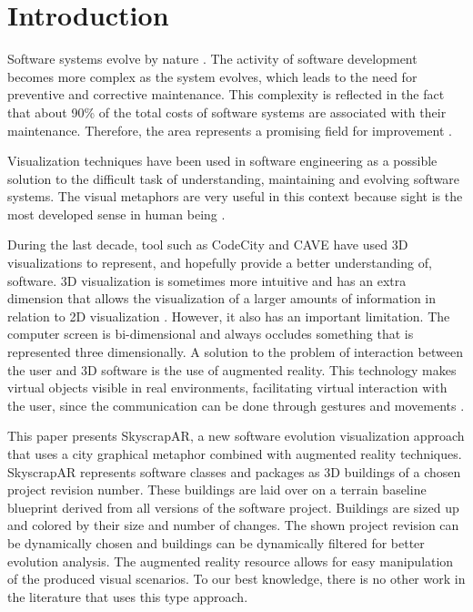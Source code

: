 \section{Introduction} \label{sec:intro}
Software systems evolve by nature \cite{lehman:1980}. The activity of software development becomes more complex as the system evolves, which leads to the need for preventive and corrective maintenance. This complexity is reflected in the fact that about 90\% of the total costs of software systems are associated with their maintenance. Therefore, the area represents a promising field for improvement \cite{erlikh:2000}.

Visualization techniques have been used in software engineering as a possible solution to the difficult task of understanding, maintaining and evolving software systems. The visual metaphors are very useful in this context because sight is the most developed sense in human being \cite{diehl:2007}.

During the last decade, tool such as  CodeCity and CAVE have used 3D visualizations to represent, and hopefully provide a better understanding of, software. 3D visualization is sometimes more intuitive and has an extra dimension that allows the visualization of a larger amounts of information in relation to 2D visualization \cite{teyseyre:2009}. However, it also has an important limitation. The computer screen is bi-dimensional and always occludes something that is represented three dimensionally. A solution to the problem of interaction between the user and 3D software is the use of augmented reality. This technology makes virtual objects visible in real environments, facilitating virtual interaction with the user, since the communication can be done through gestures and movements \cite{azuma:1997}.

This paper presents SkyscrapAR, a new software evolution visualization approach that uses a city graphical metaphor combined with augmented reality techniques. SkyscrapAR represents software classes and packages as 3D buildings of a chosen project revision number. These buildings are laid over on a terrain baseline blueprint derived from all versions of the software project. Buildings are sized up and colored by their size and number of changes. The shown project revision can be dynamically chosen and buildings can be dynamically filtered for better evolution analysis. The augmented reality resource allows for easy manipulation of the produced visual scenarios. To our best knowledge, there is no other work in the literature that uses this type approach.

